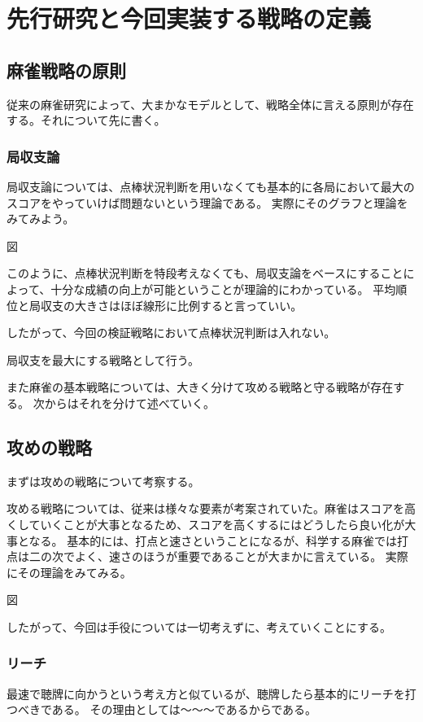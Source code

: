 \chapter{先行研究と今回実装する戦略の定義}

\section{麻雀戦略の原則}
従来の麻雀研究によって、大まかなモデルとして、戦略全体に言える原則が存在する。それについて先に書く。

\subsection{局収支論}

局収支論については、点棒状況判断を用いなくても基本的に各局において最大のスコアをやっていけば問題ないという理論である。
実際にそのグラフと理論をみてみよう。

図

このように、点棒状況判断を特段考えなくても、局収支論をベースにすることによって、十分な成績の向上が可能ということが理論的にわかっている。
平均順位と局収支の大きさはほぼ線形に比例すると言っていい。

したがって、今回の検証戦略において点棒状況判断は入れない。

局収支を最大にする戦略として行う。

また麻雀の基本戦略については、大きく分けて攻める戦略と守る戦略が存在する。
次からはそれを分けて述べていく。

\section{攻めの戦略}

まずは攻めの戦略について考察する。

攻める戦略については、従来は様々な要素が考案されていた。麻雀はスコアを高くしていくことが大事となるため、スコアを高くするにはどうしたら良い化が大事となる。
基本的には、打点と速さということになるが、科学する麻雀では打点は二の次でよく、速さのほうが重要であることが大まかに言えている。
実際にその理論をみてみる。

図

したがって、今回は手役については一切考えずに、考えていくことにする。

\subsection{リーチ}
最速で聴牌に向かうという考え方と似ているが、聴牌したら基本的にリーチを打つべきである。
その理由としては〜〜〜であるからである。

